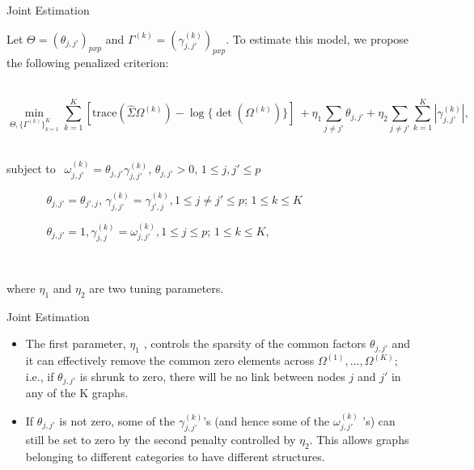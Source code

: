 \documentclass[t]{beamer}
\begin{document}
      \begin{frame}{Joint Estimation}
      
        
        
        Let $\Theta = (\theta_{j,j'})_{pxp}$ and $\Gamma^{(k)} = (\gamma_{j,j'}^{(k)})_{pxp}$. To estimate this model, we propose the following penalized criterion:
        
        \
        \begin{equation}
        \underset{\Theta,\{ \Gamma^{(k)}\}_{k=1}^{K}}{\min}   \sum_{k=1}^{K} [\mbox{trace}(\hat{\Sigma} \Omega^{(k)}) - \log\{ \det(\Omega^{(k)})\}] \ +  \eta_1 \underset{j \neq j'}{\sum} \theta_{j,j'} +   
        \eta_2 \underset{j \neq j'}{\sum} \sum_{k=1}^K |\gamma_{j,j'}^{(k)}|,
        \end{equation}
        \
        
        subject to    $ \ \ \omega_{j,j'}^{(k)}=\theta_{j,j'} \gamma_{j,j'}^{(k)}$, $\theta_{j,j'} > 0$, $1 \leq j,j' \leq p$
        
        $\ \ \ \ \ \ \ \ \ \ \ \ \ \ \ \ \theta_{j,j'} = \theta_{j',j}$, $\gamma_{j,j'}^{(k)} = \gamma_{j',j}^{(k)}, 1 \leq j \neq j' \leq p$; $1 \leq k \leq K$
        
        $\ \ \ \ \ \ \ \ \ \ \ \ \  \ \ \ \theta_{j,j'}=1,\gamma_{j,j}^{(k)}=\omega_{j,j'}^{(k)} , 1 \leq j \leq p$; $1 \leq k \leq K$,
        
        \
        
        where $\eta_1$ and $\eta_2$ are two tuning parameters.
        
        
      \end{frame}
   
    \begin{frame}{Joint Estimation}
    
   \begin{itemize}

    \item{ The first parameter, $\eta_1$ , controls the sparsity of
      the common factors $\theta_{j,j'}$ and it can effectively remove the common zero elements across
      $\Omega^{(1)},...,\Omega^{(K)}$; i.e., if $\theta_{j,j'}$ is shrunk to zero, there will be no link between nodes $j$ and $j'$ in
      any of the K graphs.}
      \pause
      \item{ If $\theta_{j,j'}$ is not zero, some of the $\gamma_{j,j'}^{(k)}$’s (and hence some of the $\omega_{j,j'}^{(k)}$ ’s) can
      still be set to zero by the second penalty controlled by $\eta_2$. This allows graphs belonging to different categories
      to have different structures.}
    
    \end{itemize}  
      
    \end{frame}
\end{document}
